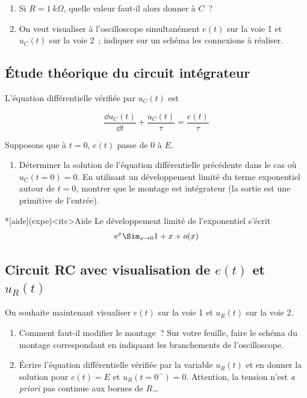 \documentclass[../main/main.tex]{subfiles}
\begin{document}
\begin{enumerate}[label=\clenumi, start=3]
	\item Si $R = \SI{1}{k\Omega}$, quelle valeur faut-il alors donner à $C$~?
	\item On veut visualiser à l'oscilloscope simultanément $e(t)$ sur la voie 1
	      et $u_{C}(t)$ sur la voie 2~; indiquer sur un schéma les connexions à
	      réaliser.
\end{enumerate}

\subsection{Étude théorique du circuit intégrateur}
\label{ssec:cint}

L'équation différentielle vérifiée par $u_{C}(t)$ est

\[\frac{\dd u_{C}(t)}{\dd t} + \frac{u_{C}(t)}{\tau} = \frac{e(t)}{\tau}\]

Supposons que à $t=0$, $e(t)$ passe de $0$ à $E$.

\begin{enumerate}[label=\clenumi, resume]
  \item \label{q:sol}
        Déterminer la solution de l'équation différentielle précédente dans
	      le cas où $u_{C}(t=0) = 0$. En utilisant un développement limité du
	      terme exponentiel autour de $t = 0$, montrer que le montage est
	      intégrateur (la sortie est une primitive de l'entrée).
\end{enumerate}

\medskip

\begin{tcb}*[aide](expe)<itc>{Aide}
	Le développement limité de l'exponentiel s'écrit
	\[\text{e}^x \Sim_{x \to 0} 1+x + o(x)\]
\end{tcb}

\subsection{Circuit RC avec visualisation de $e(t)$ et $u_{R}(t)$}
\label{ssec:uR}

On souhaite maintenant visualiser $e(t)$ sur la voie 1 et $u_{R}(t)$ sur la voie
2.

\begin{enumerate}[label=\clenumi, resume]
	\item Comment faut-il modifier le montage~? Sur votre feuille, faire le
	      schéma du montage correspondant en indiquant les branchements de
	      l'oscilloscope.
	\item Écrire l'équation différentielle vérifiée par la variable $u_{R}(t)$
	      et en donner la solution pour $e(t) = E$ et $u_{R}(t=0^-) = 0$.
	      Attention, la tension n'est \textit{a priori} pas continue aux bornes de
	      $R$…
\end{enumerate}
\end{document}
